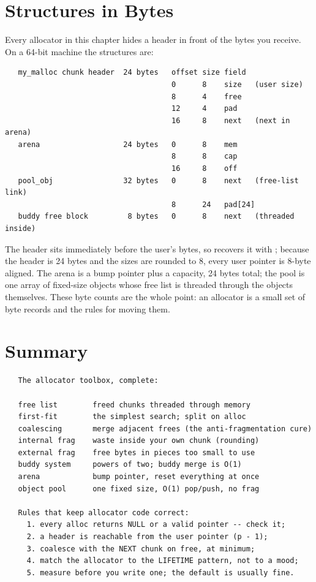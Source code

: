 \section{Structures in Bytes}

Every allocator in this chapter hides a header in front of the bytes
you receive. On a 64-bit machine the structures are:

\begin{verbatim}
   my_malloc chunk header  24 bytes   offset size field
                                      0      8    size   (user size)
                                      8      4    free
                                      12     4    pad
                                      16     8    next   (next in arena)
   arena                   24 bytes   0      8    mem
                                      8      8    cap
                                      16     8    off
   pool_obj                32 bytes   0      8    next   (free-list link)
                                      8      24   pad[24]
   buddy free block         8 bytes   0      8    next   (threaded inside)
\end{verbatim}

The header sits immediately before the user's bytes, so
 recovers it with ; because the
header is 24 bytes and the sizes are rounded to 8, every user pointer
is 8-byte aligned. The arena is a bump pointer plus a capacity, 24
bytes total; the pool is one array of fixed-size objects whose free
list is threaded through the objects themselves. These byte counts are
the whole point: an allocator is a small set of byte records and the
rules for moving them.

\section{Summary}

\begin{verbatim}
   The allocator toolbox, complete:

   free list        freed chunks threaded through memory
   first-fit        the simplest search; split on alloc
   coalescing       merge adjacent frees (the anti-fragmentation cure)
   internal frag    waste inside your own chunk (rounding)
   external frag    free bytes in pieces too small to use
   buddy system     powers of two; buddy merge is O(1)
   arena            bump pointer, reset everything at once
   object pool      one fixed size, O(1) pop/push, no frag

   Rules that keep allocator code correct:
     1. every alloc returns NULL or a valid pointer -- check it;
     2. a header is reachable from the user pointer (p - 1);
     3. coalesce with the NEXT chunk on free, at minimum;
     4. match the allocator to the LIFETIME pattern, not to a mood;
     5. measure before you write one; the default is usually fine.
\end{verbatim}

